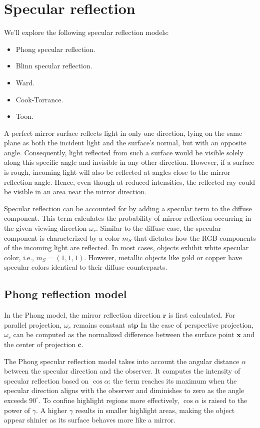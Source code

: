 \section{Specular reflection}

We'll explore the following specular reflection models:
\begin{itemize}
    \item Phong specular reflection.
    \item Blinn specular reflection.
    \item Ward.
    \item Cook-Torrance.
    \item Toon.
\end{itemize}
A perfect mirror surface reflects light in only one direction, lying on the same plane as both the incident light and the surface's normal, but with an opposite angle. 
Consequently, light reflected from such a surface would be visible solely along this specific angle and invisible in any other direction. 
However, if a surface is rough, incoming light will also be reflected at angles close to the mirror reflection angle. 
Hence, even though at reduced intensities, the reflected ray could be visible in an area near the mirror direction.

Specular reflection can be accounted for by adding a specular term to the diffuse component. 
This term calculates the probability of mirror reflection occurring in the given viewing direction $\omega_r$.
Similar to the diffuse case, the specular component is characterized by a color $m_S$ that dictates how the RGB components of the incoming light are reflected.
In most cases, objects exhibit white specular color, i.e., $m_S = (1,1,1)$.
However, metallic objects like gold or copper have specular colors identical to their diffuse counterparts.

\subsection{Phong reflection model}
In the Phong model, the mirror reflection direction $\mathbf{r}$  is first calculated.
For parallel projection, $\omega_r$ remains constant at$\mathbf{p}$
In the case of perspective projection, $\omega_r$ can be computed as the normalized difference between the surface point $\mathbf{x}$ and the center of projection $\mathbf{c}$. 

The Phong specular reflection model takes into account the angular distance $\alpha$ between the specular direction and the observer. 
It computes the intensity of specular reflection based on $\cos\alpha$: the term reaches its maximum when the specular direction aligns with the observer and diminishes to zero as the angle exceeds $90^\circ$. 
To confine highlight regions more effectively, $\cos\alpha$ is raised to the power of $\gamma$.
A higher $\gamma$ results in smaller highlight areas, making the object appear shinier as its surface behaves more like a mirror.

